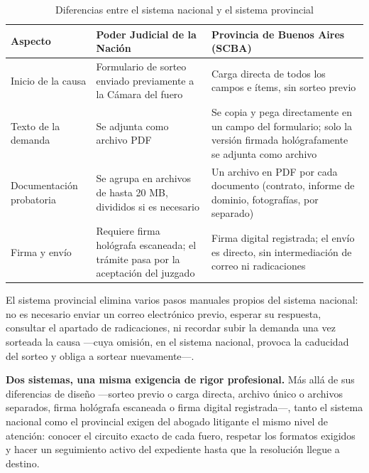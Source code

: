 \documentclass[12pt,oneside]{book}
\begin{document}
\begin{table}[H]
\centering
\caption{Diferencias entre el sistema nacional y el sistema provincial}
\begin{tabularx}{\textwidth}{>{\raggedright\arraybackslash}p{} >{\raggedright\arraybackslash}p{} X}
\toprule
\textbf{Aspecto} & \textbf{Poder Judicial de la Nación} & \textbf{Provincia de Buenos Aires (SCBA)} \\
\midrule
Inicio de la causa & Formulario de sorteo enviado previamente a la Cámara del fuero & Carga directa de todos los campos e ítems, sin sorteo previo \\
Texto de la demanda & Se adjunta como archivo PDF & Se copia y pega directamente en un campo del formulario; solo la versión firmada hológrafamente se adjunta como archivo \\
Documentación probatoria & Se agrupa en archivos de hasta 20 MB, divididos si es necesario & Un archivo en PDF por cada documento (contrato, informe de dominio, fotografías, por separado) \\
Firma y envío & Requiere firma hológrafa escaneada; el trámite pasa por la aceptación del juzgado & Firma digital registrada; el envío es directo, sin intermediación de correo ni radicaciones \\
\bottomrule
\end{tabularx}
\end{table}

El sistema provincial elimina varios pasos manuales propios del sistema nacional: no es necesario enviar un correo electrónico previo, esperar su respuesta, consultar el apartado de radicaciones, ni recordar subir la demanda una vez sorteada la causa —cuya omisión, en el sistema nacional, provoca la caducidad del sorteo y obliga a sortear nuevamente—.

\begin{important}
\textbf{Dos sistemas, una misma exigencia de rigor profesional.} Más allá de sus diferencias de diseño —sorteo previo o carga directa, archivo único o archivos separados, firma hológrafa escaneada o firma digital registrada—, tanto el sistema nacional como el provincial exigen del abogado litigante el mismo nivel de atención: conocer el circuito exacto de cada fuero, respetar los formatos exigidos y hacer un seguimiento activo del expediente hasta que la resolución llegue a destino.
\end{important}

\end{document}
